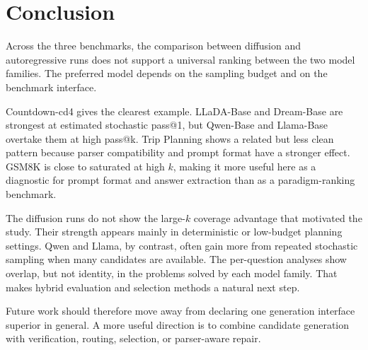 \section{Conclusion}
\label{sec:conclusion}

Across the three benchmarks, the comparison between diffusion and
autoregressive runs does not support a universal ranking between the two model
families. The preferred model depends on the sampling budget and on the
benchmark interface.

Countdown-cd4 gives the clearest example. LLaDA-Base and Dream-Base are
strongest at estimated stochastic pass@1, but Qwen-Base and Llama-Base overtake
them at high pass@k. Trip Planning shows a related but less clean pattern
because parser compatibility and prompt format have a stronger effect. GSM8K is
close to saturated at high $k$, making it more useful here as a diagnostic for
prompt format and answer extraction than as a paradigm-ranking benchmark.

The diffusion runs do not show the large-$k$ coverage advantage that motivated
the study. Their strength appears mainly in deterministic or low-budget planning
settings. Qwen and Llama, by contrast, often gain more from repeated stochastic
sampling when many candidates are available. The per-question analyses show
overlap, but not identity, in the problems solved by each model family. That
makes hybrid evaluation and selection methods a natural next step.

Future work should therefore move away from declaring one generation interface
superior in general. A more useful direction is to combine candidate generation
with verification, routing, selection, or parser-aware repair.
